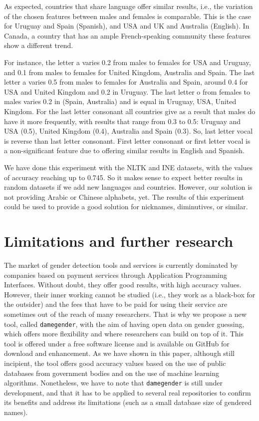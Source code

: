 \documentclass[a4paper]{article}
\begin{document}
As expected, countries that share language offer similar results, i.e., the variation of the chosen features between males and females is comparable.
This is the case for Uruguay and Spain (Spanish), and USA and UK and Australia (English).
In Canada, a country that has an ample French-speaking community these features show a different trend.

For instance, the letter a varies 0.2 from males to females for USA and Uruguay, and 0.1 from males to females for United Kingdom, Australia and Spain.
The last letter a varies 0.5 from males to females for Australia and Spain, around 0.4 for USA and United Kingdom and 0.2 in
Uruguay.
The last letter o from females to males varies 0.2 in (Spain, Australia) and is equal in Uruguay, USA, United Kingdom.
For the last letter consonant all countries give as a result that males do have it more frequently, with results that range from 0.3 to 0.5: Uruguay and USA (0.5), United Kingdom (0.4), Australia and Spain (0.3). 
So, last letter vocal is reverse than last letter consonant. 
First letter consonant or first letter vocal is a non-significant feature due to offering similar results in English and Spanish.

We have done this experiment with the NLTK and INE datasets, with the values of accuracy reaching up to 0.745.
So it makes sense to expect better results in random datasets if we add new languages and countries.
However, our solution is not providing Arabic or Chinese alphabets, yet.
The results of this experiment could be used to provide a good solution for nicknames, diminutives, or similar.


\section{Limitations and further research}

The market of gender detection tools and services is currently dominated by companies based on payment services through Application Programming Interfaces.
Without doubt, they offer good results, with high accuracy values.
However, their inner working cannot be studied (i.e., they work as a black-box for the outsider) and the fees that have to be paid for using their service are sometimes out of the reach of many researchers.
That is why we propose a new tool, called \texttt{damegender}, with the aim of having open data on gender guessing, which offers more flexibility and where researchers can build on top of it.
This tool is offered under a free software license and is available on GitHub for download and enhancement.
As we have shown in this paper, although still incipient, the tool offers good accuracy values based on the use of public databases from government bodies and on the use of machine learning algorithms.
Nonetheless, we have to note that \texttt{damegender} is still under development, and that it has to be applied to several real repositories to confirm its benefits and address its limitations (such as a small database size of gendered names).
\end{document}
